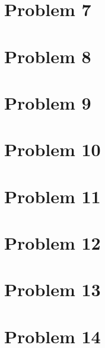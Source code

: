 \documentclass{article}
\begin{document}
\section*{Problem 7}
\section*{Problem 8}
\section*{Problem 9}
\section*{Problem 10}
\section*{Problem 11}
\section*{Problem 12}
\section*{Problem 13}
\section*{Problem 14}
\end{document}
